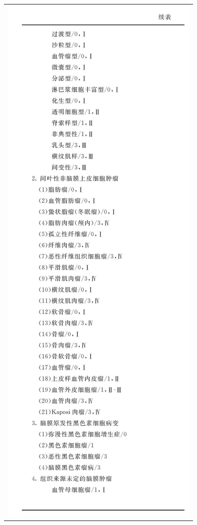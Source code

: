 \begin{longtable}{c}
\includegraphics[width=\textwidth,height=\textheight,keepaspectratio]{./images/Image00062.jpg}\\

\end{longtable}
